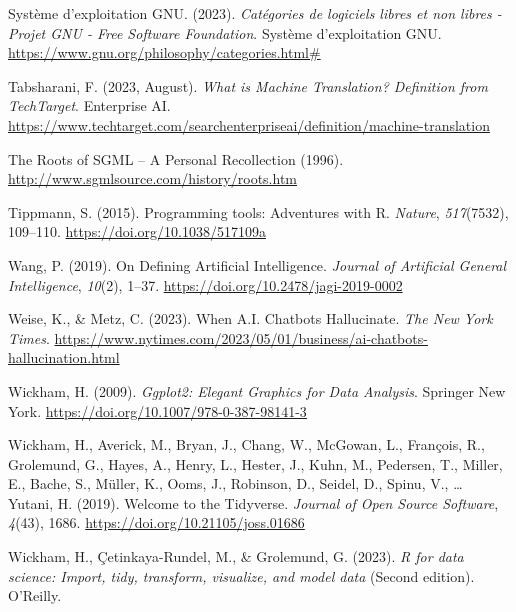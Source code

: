 \documentclass[
  letterpaper,
  DIV=11,
  numbers=noendperiod]{scrreprt}
\newlength{\cslhangindent}
\newlength{\cslentryspacingunit} %
\newenvironment{CSLReferences}[2] %
 {%
  \setlength{\parindent}{0pt}
  \ifodd #1
  \let\oldpar\par
  \def\par{\hangindent=\cslhangindent\oldpar}
  \fi
  \setlength{\parskip}{#2\cslentryspacingunit}
 }%
 {}
\begin{document}
\begin{CSLReferences}{1}{0}
\leavevmode{}%
Système d'exploitation GNU. (2023). \emph{Catégories de logiciels libres
et non libres - {Projet GNU} - {Free Software Foundation}}. Système
d'exploitation GNU.
\url{https://www.gnu.org/philosophy/categories.html\#}

\leavevmode{}%
Tabsharani, F. (2023, August). \emph{What is {Machine Translation}?
{Definition} from {TechTarget}}. Enterprise AI.
\url{https://www.techtarget.com/searchenterpriseai/definition/machine-translation}

\leavevmode{}%
The {Roots} of {SGML} -- {A Personal Recollection} (1996).
\url{http://www.sgmlsource.com/history/roots.htm}

\leavevmode{}%
Tippmann, S. (2015). Programming tools: {Adventures} with {R}.
\emph{Nature}, \emph{517}(7532), 109--110.
\url{https://doi.org/10.1038/517109a}

\leavevmode{}%
Wang, P. (2019). On {Defining Artificial Intelligence}. \emph{Journal of
Artificial General Intelligence}, \emph{10}(2), 1--37.
\url{https://doi.org/10.2478/jagi-2019-0002}

\leavevmode{}%
Weise, K., \& Metz, C. (2023). When {A}.{I}. {Chatbots Hallucinate}.
\emph{The New York Times}.
\url{https://www.nytimes.com/2023/05/01/business/ai-chatbots-hallucination.html}

\leavevmode{}%
Wickham, H. (2009). \emph{Ggplot2: {Elegant Graphics} for {Data
Analysis}}. Springer New York.
\url{https://doi.org/10.1007/978-0-387-98141-3}

\leavevmode{}%
Wickham, H., Averick, M., Bryan, J., Chang, W., McGowan, L., François,
R., Grolemund, G., Hayes, A., Henry, L., Hester, J., Kuhn, M., Pedersen,
T., Miller, E., Bache, S., Müller, K., Ooms, J., Robinson, D., Seidel,
D., Spinu, V., \ldots{} Yutani, H. (2019). Welcome to the {Tidyverse}.
\emph{Journal of Open Source Software}, \emph{4}(43), 1686.
\url{https://doi.org/10.21105/joss.01686}

\leavevmode{}%
Wickham, H., Çetinkaya-Rundel, M., \& Grolemund, G. (2023). \emph{R for
data science: Import, tidy, transform, visualize, and model data}
(Second edition). O'Reilly.


\end{CSLReferences}
\end{document}
